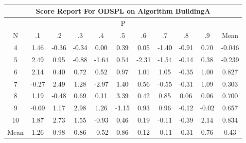 \documentclass[11pt,a4paper]{report}
\begin{document}
\begin{longtable}{ | c || c | c | c | c | c | c | c | c | c || c |}
\hline
\multicolumn{11}{|c|}{ Score Report For ODSPL on Algorithm BuildingA} \\
\hline
\multicolumn{11}{|c|}{ P } \\
\hline
N & .1 & .2 & .3 & .4 & .5 & .6 & .7 & .8 & .9 & Mean\\
 \hline
 \hline
 \endhead
  4 &  \cellcolor[HTML]{D7D7FF} 1.46 &  \cellcolor[HTML]{FFF7F7} -0.36 &  \cellcolor[HTML]{FFF7F7} -0.34 &  \cellcolor[HTML]{FFFFFF} 0.00 &  \cellcolor[HTML]{F7F7FF} 0.39 &  \cellcolor[HTML]{FFFFFF} 0.05 &  \cellcolor[HTML]{FFDFDF} -1.40 &  \cellcolor[HTML]{FFE7E7} -0.91 &  \cellcolor[HTML]{EFEFFF} 0.70 & -0.046 \\
  5 &  \cellcolor[HTML]{BFBFFF} 2.49 &  \cellcolor[HTML]{E7E7FF} 0.95 &  \cellcolor[HTML]{FFE7E7} -0.88 &  \cellcolor[HTML]{FFD7D7} -1.64 &  \cellcolor[HTML]{EFEFFF} 0.54 &  \cellcolor[HTML]{FFC7C7} -2.31 &  \cellcolor[HTML]{FFD7D7} -1.54 &  \cellcolor[HTML]{FFFFFF} -0.14 &  \cellcolor[HTML]{F7F7FF} 0.38 & -0.239 \\
  6 &  \cellcolor[HTML]{C7C7FF} 2.14 &  \cellcolor[HTML]{F7F7FF} 0.40 &  \cellcolor[HTML]{EFEFFF} 0.72 &  \cellcolor[HTML]{EFEFFF} 0.52 &  \cellcolor[HTML]{E7E7FF} 0.97 &  \cellcolor[HTML]{E7E7FF} 1.01 &  \cellcolor[HTML]{E7E7FF} 1.05 &  \cellcolor[HTML]{FFF7F7} -0.35 &  \cellcolor[HTML]{E7E7FF} 1.00 & 0.827 \\
  7 &  \cellcolor[HTML]{FFF7F7} -0.27 &  \cellcolor[HTML]{BFBFFF} 2.49 &  \cellcolor[HTML]{DFDFFF} 1.28 &  \cellcolor[HTML]{FFB7B7} -2.97 &  \cellcolor[HTML]{DFDFFF} 1.40 &  \cellcolor[HTML]{EFEFFF} 0.56 &  \cellcolor[HTML]{FFEFEF} -0.55 &  \cellcolor[HTML]{FFF7F7} -0.31 &  \cellcolor[HTML]{E7E7FF} 1.09 & 0.303 \\
  8 &  \cellcolor[HTML]{DFDFFF} 1.19 &  \cellcolor[HTML]{FFEFEF} -0.48 &  \cellcolor[HTML]{EFEFFF} 0.69 &  \cellcolor[HTML]{FFFFFF} 0.11 &  \cellcolor[HTML]{A7A7FF} 3.39 &  \cellcolor[HTML]{F7F7FF} 0.42 &  \cellcolor[HTML]{E7E7FF} 0.85 &  \cellcolor[HTML]{FFFFFF} 0.06 &  \cellcolor[HTML]{FFFFFF} 0.06 & 0.700 \\
  9 &  \cellcolor[HTML]{FFFFFF} -0.09 &  \cellcolor[HTML]{DFDFFF} 1.17 &  \cellcolor[HTML]{B7B7FF} 2.98 &  \cellcolor[HTML]{DFDFFF} 1.26 &  \cellcolor[HTML]{FFDFDF} -1.15 &  \cellcolor[HTML]{E7E7FF} 0.93 &  \cellcolor[HTML]{E7E7FF} 0.96 &  \cellcolor[HTML]{FFFFFF} -0.12 &  \cellcolor[HTML]{FFFFFF} -0.02 & 0.657 \\
  10 &  \cellcolor[HTML]{CFCFFF} 1.87 &  \cellcolor[HTML]{B7B7FF} 2.73 &  \cellcolor[HTML]{D7D7FF} 1.55 &  \cellcolor[HTML]{FFE7E7} -0.93 &  \cellcolor[HTML]{F7F7FF} 0.46 &  \cellcolor[HTML]{F7F7FF} 0.19 &  \cellcolor[HTML]{FFFFFF} -0.11 &  \cellcolor[HTML]{FFF7F7} -0.39 &  \cellcolor[HTML]{C7C7FF} 2.14 & 0.834 \\
 \hline
 \hline
Mean &  \cellcolor[HTML]{DFDFFF} 1.26 &  \cellcolor[HTML]{E7E7FF} 0.98 &  \cellcolor[HTML]{E7E7FF} 0.86 &  \cellcolor[HTML]{FFEFEF} -0.52 &  \cellcolor[HTML]{E7E7FF} 0.86 &  \cellcolor[HTML]{FFFFFF} 0.12 &  \cellcolor[HTML]{FFFFFF} -0.11 &  \cellcolor[HTML]{FFF7F7} -0.31 &  \cellcolor[HTML]{EFEFFF} 0.76 &  \cellcolor[HTML]{F7F7FF} 0.43
\end{longtable}
\end{document}
